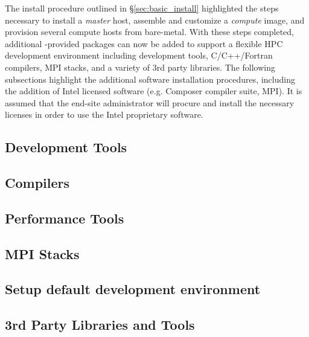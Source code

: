 \documentclass[letterpaper]{article}
\begin{document}
The install procedure outlined in \S\ref{sec:basic_install}
highlighted the steps necessary to install a {\em master} host,
assemble and customize a {\em compute} image, and provision several
compute hosts from bare-metal.  With these steps completed, 
additional \OHPC{}-provided packages can now be added to support a flexible HPC
development environment including development tools, C/C++/Fortran compilers,
MPI stacks, and a variety of 3rd party libraries. The following subsections
highlight the additional software installation procedures, including the
addition of Intel licensed software (e.g. Composer compiler suite, \Intel{}
MPI). It is assumed that the end-site administrator will procure and install
the necessary licenses in order to use the Intel proprietary software.

\subsection{Development Tools} \label{sec:install_dev_tools}


\subsection{Compilers} \label{sec:install_compilers}


\subsection{Performance Tools} \label{sec:install_perf_tools}


\subsection{MPI Stacks} \label{sec:mpi}


\subsection{Setup default development environment}



\subsection{3rd Party Libraries and Tools} \label{sec:3rdparty}
\end{document}
